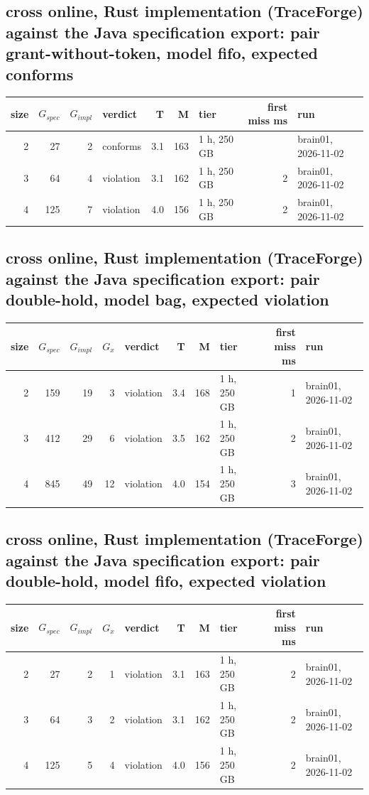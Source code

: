 \documentclass[10pt]{article}
\begin{document}
\subsection*{cross online, Rust implementation (TraceForge) against the Java specification export: pair \textsf{grant-without-token}, model fifo, expected conforms}
\begin{longtable}{@{}rrrlrrlrl@{}}
\toprule
size & $G_{\mathit{spec}}$ & $G_{\mathit{impl}}$ & verdict & T & M & tier & first miss ms & run \\
\midrule
\endhead
\color{red} 2 & 27 & 2 & conforms & 3.1 & 163 & 1 h, 250 GB &  & brain01, 2026-11-02 \\
\color{red} 3 & 64 & 4 & violation & 3.1 & 162 & 1 h, 250 GB & 2 & brain01, 2026-11-02 \\
\color{red} 4 & 125 & 7 & violation & 4.0 & 156 & 1 h, 250 GB & 2 & brain01, 2026-11-02 \\
\bottomrule
\end{longtable}
\subsection*{cross online, Rust implementation (TraceForge) against the Java specification export: pair \textsf{double-hold}, model bag, expected violation}
\begin{longtable}{@{}rrrrlrrlrl@{}}
\toprule
size & $G_{\mathit{spec}}$ & $G_{\mathit{impl}}$ & $G_x$ & verdict & T & M & tier & first miss ms & run \\
\midrule
\endhead
\color{red} 2 & 159 & 19 & 3 & violation & 3.4 & 168 & 1 h, 250 GB & 1 & brain01, 2026-11-02 \\
\color{red} 3 & 412 & 29 & 6 & violation & 3.5 & 162 & 1 h, 250 GB & 2 & brain01, 2026-11-02 \\
\color{red} 4 & 845 & 49 & 12 & violation & 4.0 & 154 & 1 h, 250 GB & 3 & brain01, 2026-11-02 \\
\bottomrule
\end{longtable}
\subsection*{cross online, Rust implementation (TraceForge) against the Java specification export: pair \textsf{double-hold}, model fifo, expected violation}
\begin{longtable}{@{}rrrrlrrlrl@{}}
\toprule
size & $G_{\mathit{spec}}$ & $G_{\mathit{impl}}$ & $G_x$ & verdict & T & M & tier & first miss ms & run \\
\midrule
\endhead
\color{red} 2 & 27 & 2 & 1 & violation & 3.1 & 163 & 1 h, 250 GB & 2 & brain01, 2026-11-02 \\
\color{red} 3 & 64 & 3 & 2 & violation & 3.1 & 162 & 1 h, 250 GB & 2 & brain01, 2026-11-02 \\
\color{red} 4 & 125 & 5 & 4 & violation & 4.0 & 156 & 1 h, 250 GB & 2 & brain01, 2026-11-02 \\
\bottomrule
\end{longtable}
\end{document}

